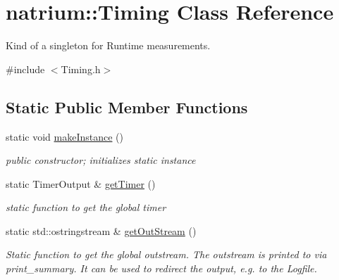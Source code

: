 \hypertarget{classnatrium_1_1Timing}{
\section{natrium::Timing Class Reference}
\label{classnatrium_1_1Timing}
}


Kind of a singleton for Runtime measurements.  


{\ttfamily \#include $<$Timing.h$>$}\subsection*{Static Public Member Functions}
\begin{DoxyCompactItemize}
\item 
\hypertarget{classnatrium_1_1Timing_aead987028840426c2b85fed5915d3854}{
static void \hyperlink{classnatrium_1_1Timing_aead987028840426c2b85fed5915d3854}{makeInstance} ()}
\label{classnatrium_1_1Timing_aead987028840426c2b85fed5915d3854}

\begin{DoxyCompactList}\small\item\em public constructor; initializes static instance \item\end{DoxyCompactList}\item 
\hypertarget{classnatrium_1_1Timing_a60dd1b626a67c97f016e0c76616ccf65}{
static TimerOutput \& \hyperlink{classnatrium_1_1Timing_a60dd1b626a67c97f016e0c76616ccf65}{getTimer} ()}
\label{classnatrium_1_1Timing_a60dd1b626a67c97f016e0c76616ccf65}

\begin{DoxyCompactList}\small\item\em static function to get the global timer \item\end{DoxyCompactList}\item 
\hypertarget{classnatrium_1_1Timing_a200f8c6a0776b98c8937ab3cb56e2b01}{
static std::ostringstream \& \hyperlink{classnatrium_1_1Timing_a200f8c6a0776b98c8937ab3cb56e2b01}{getOutStream} ()}
\label{classnatrium_1_1Timing_a200f8c6a0776b98c8937ab3cb56e2b01}

\begin{DoxyCompactList}\small\item\em Static function to get the global outstream. The outstream is printed to via print\_\-summary. It can be used to redirect the output, e.g. to the Logfile. \item\end{DoxyCompactList}\end{DoxyCompactItemize}


